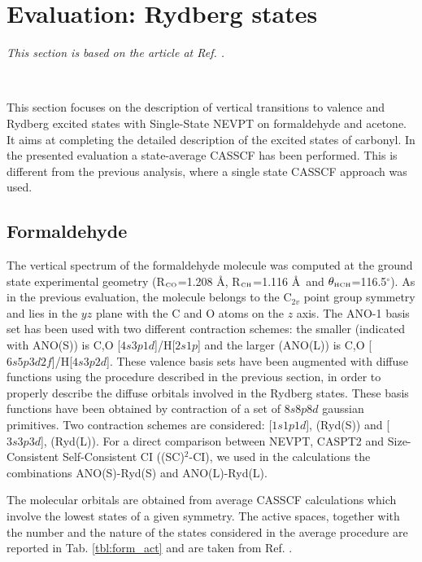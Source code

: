 \section{Evaluation: Rydberg states}

\begin{center}
\textit{This section is based on the article at Ref. .}
\end{center}
{\ }\\
\vspace{-1mm}

This section focuses on the description of vertical transitions to valence and
Rydberg excited states with Single-State NEVPT on formaldehyde and acetone.
It aims at completing the detailed description of the excited states of
carbonyl. In the presented evaluation a state-average CASSCF has been
performed. This is different from the previous analysis, where a single state
CASSCF approach was used.

\subsection{Formaldehyde}

The vertical spectrum of the formaldehyde molecule was computed at the
ground state experimental geometry\cite{jms-18-344-1965} (R$_{\mbox{\tiny CO}}$=1.208 \AA,
R$_{\mbox{\tiny CH}}$=1.116 \AA\ and $\theta_{\mbox{\tiny
HCH}}$=116.5$^{\circ}$). As in the previous evaluation, the molecule belongs
to the C$_{2v}$ point group symmetry and lies in the $yz$ plane with the
C and O atoms on the $z$ axis.  The
ANO-1 basis set\cite{tca-77-291-1990} has been used with two different
contraction schemes: the smaller (indicated with ANO(S)) is C,O
[$4s3p1d$]/H[$2s1p$] and the larger (ANO(L)) is C,O
[$6s5p3d2f$]/H[$4s3p2d$].  These valence basis sets have been augmented with
diffuse functions using the procedure described in the previous section, in
order to properly describe the diffuse orbitals involved in the Rydberg
states. These basis functions have been obtained by contraction of a
set of $8s8p8d$ gaussian primitives. Two contraction schemes are considered:
[$1s1p1d$], (Ryd(S)) and [$3s3p3d$], (Ryd(L)).  For a direct comparison
between NEVPT, CASPT2\cite{tca-92-227-1995} and Size-Consistent
Self-Consistent CI ((SC)$^2$-CI)\cite{mp-101-483-2003}, we used in the
calculations the combinations ANO(S)-Ryd(S) and ANO(L)-Ryd(L).

The molecular orbitals are obtained from average CASSCF calculations which
involve the lowest states of a given symmetry. The active spaces, together
with the number and the nature of the states considered in the average
procedure are reported in Tab. \ref{tbl:form_act} and are taken from Ref.
.

